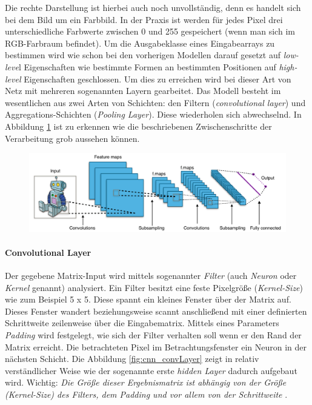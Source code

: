 Die rechte Darstellung ist hierbei auch noch unvollständig, denn es handelt sich bei dem Bild um ein Farbbild. In der Praxis ist werden für jedes Pixel drei unterschiedliche Farbwerte zwischen 0 und 255 gespeichert (wenn man sich im RGB-Farbraum befindet). Um die Ausgabeklasse eines Eingabearrays zu bestimmen wird wie schon bei den vorherigen Modellen darauf gesetzt auf \emph{low-leve}l Eigenschaften wie bestimmte Formen an bestimmten Positionen auf \emph{high-level} Eigenschaften geschlossen. Um dies zu erreichen wird bei dieser Art von Netz mit mehreren sogenannten Layern gearbeitet. Das Modell besteht im wesentlichen aus zwei Arten von Schichten: den Filtern (\emph{convolutional layer}) und Aggregations-Schichten (\emph{Pooling Layer}). Diese wiederholen sich abwechselnd. In Abbildung \ref{fig:cnnOverview} ist zu erkennen wie die beschriebenen Zwischenschritte der Verarbeitung grob aussehen können. 

\begin{figure}[!htb]
	\centering
	\includegraphics[width=.9\linewidth]{img/cnn_overview}
	\label{fig:cnnOverview}
\end{figure}

\paragraph{Convolutional Layer}
Der gegebene Matrix-Input wird mittels sogenannter \emph{Filter} (auch \emph{Neuron} oder \emph{Kernel} genannt) analysiert. Ein Filter besitzt eine feste Pixelgröße (\emph{Kernel-Size}) wie zum Beispiel 5 x 5. Diese spannt ein kleines \glqq Fenster \grqq über der Matrix auf. Dieses Fenster wandert beziehungsweise scannt anschließend mit einer definierten Schrittweite zeilenweise über die Eingabematrix. Mittels eines Parameters \emph{Padding} wird festgelegt, wie sich der Filter verhalten soll wenn er den Rand der Matrix erreicht. Die betrachteten Pixel im Betrachtungsfenster ein Neuron in der nächsten Schicht. Die Abbildung \ref{fig:cnn_convLayer} zeigt in relativ verständlicher Weise wie der sogenannte erste \emph{hidden Layer} dadurch aufgebaut wird. Wichtig: \emph{Die Größe dieser Ergebnismatrix ist abhängig von der Größe (Kernel-Size) des Filters, dem Padding und vor allem von der Schrittweite} \cite{cnnFunktionsweise2}. 

